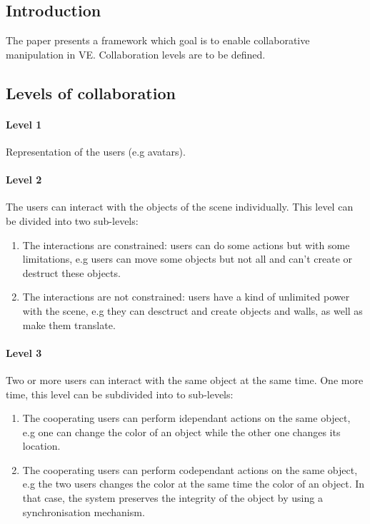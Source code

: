 \documentclass[a4paper]{article}
\begin{document}
\subsection{Introduction}
The paper presents a framework which goal is to enable collaborative manipulation in VE. Collaboration levels are to be defined.

\subsection{Levels of collaboration}
\paragraph{Level 1} Representation of the users (e.g avatars).
\paragraph{Level 2} The users can interact with the objects of the scene individually. This level can be divided into two sub-levels:
\begin{enumerate}
	\item The interactions are constrained: users can do some actions but with some limitations, e.g users can move some objects but not all and can't create or destruct these objects.
	\item The interactions are not constrained: users have a kind of unlimited power with the scene, e.g they can desctruct and create objects and walls, as well as make them translate.
\end{enumerate}

\paragraph{Level 3} Two or more users can interact with the same object at the same time. One more time, this level can be subdivided into to sub-levels:
\begin{enumerate}
	\item The cooperating users can perform idependant actions on the same object, e.g one can change the color of an object while the other one changes its location.
	\item The cooperating users can perform codependant actions on the same object, e.g the two users changes the color at the same time the color of an object. In that case, the system preserves the integrity of the object by using a synchronisation mechanism.
\end{enumerate}
\end{document}
